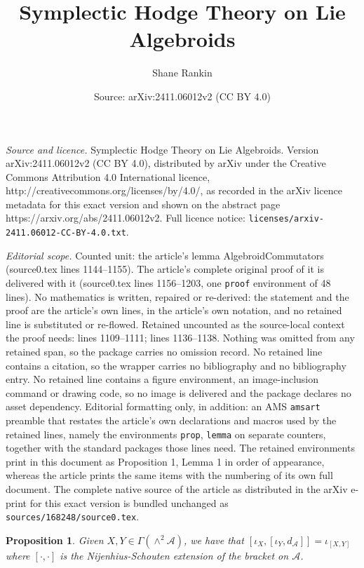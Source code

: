 \documentclass[10pt,a4paper]{amsart}
\title{Symplectic Hodge Theory on Lie Algebroids}
\author{Shane Rankin}
\date{Source: arXiv:2411.06012v2 (CC BY 4.0)}
\newtheorem{prop}{Proposition}
\newcommand{\A}{\mathcal{A}}
\begin{document}
\maketitle

\noindent\emph{Source and licence.} Symplectic Hodge Theory on Lie Algebroids. Version arXiv:2411.06012v2 (CC BY 4.0), distributed by arXiv under the Creative Commons Attribution 4.0 International licence, http://creativecommons.org/licenses/by/4.0/, as recorded in the arXiv licence metadata for this exact version and shown on the abstract page https://arxiv.org/abs/2411.06012v2. Full licence notice: \texttt{licenses/arxiv-2411.06012-CC-BY-4.0.txt}.\par\smallskip

\noindent\textit{Editorial scope.} Counted unit: the article's lemma AlgebroidCommutators (source0.tex lines 1144--1155). The article's complete original proof of it is delivered with it (source0.tex lines 1156--1203, one \texttt{proof} environment of 48 lines). No mathematics is written, repaired or re-derived: the statement and the proof are the article's own lines, in the article's own notation, and no retained line is substituted or re-flowed.  Retained uncounted as the source-local context the proof needs: lines 1109--1111; lines 1136--1138.  Nothing was omitted from any retained span, so the package carries no omission record.  No retained line contains a citation, so the wrapper carries no bibliography and no bibliography entry.  No retained line contains a figure environment, an image-inclusion command or drawing code, so no image is delivered and the package declares no asset dependency.  Editorial formatting only, in addition: an AMS \texttt{amsart} preamble that restates the article's own declarations and macros used by the retained lines, namely the environments \texttt{prop}, \texttt{lemma} on separate counters, together with the standard packages those lines need.  The retained environments print in this document as Proposition 1, Lemma 1 in order of appearance, whereas the article prints the same items with the numbering of its own full document.  The complete native source of the article as distributed in the arXiv e-print for this exact version is bundled unchanged as \texttt{sources/168248/source0.tex}.
\begin{prop}\label{CartanWedge2}
    Given $X,Y \in \Gamma(\wedge^2 \A)$, we have that $[\iota_X, [\iota_Y,d_\A]]=\iota_{[X,Y]}$ where $[\cdot,\cdot]$ is the Nijenhius-Schouten extension of the bracket on $\A$.
\end{prop}
\end{document}
